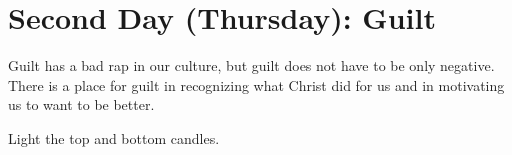 %
%
%
%
%
%



\clearpage
\section{Second Day (Thursday): Guilt}
Guilt has a bad rap in our culture, but guilt does not have to be only negative.  There is a place for guilt in recognizing what Christ did for us and in motivating us to want to be better.

Light the top and bottom candles.

